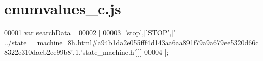 \hypertarget{enumvalues__c_8js_source}{}\section{enumvalues\+\_\+c.\+js}
\label{enumvalues__c_8js_source}

\begin{DoxyCode}
\hypertarget{enumvalues__c_8js_source.tex_l00001}{}\hyperlink{enumvalues__c_8js_ad01a7523f103d6242ef9b0451861231e}{00001} var \hyperlink{enumvalues__c_8js_ad01a7523f103d6242ef9b0451861231e}{searchData}=
00002 [
00003   [\textcolor{stringliteral}{'stop'},[\textcolor{stringliteral}{'STOP'},[\textcolor{stringliteral}{'
      ../state\_\_machine\_8h.html#a94b1da2e055fff4d143aa6aa891f79a9a679ee5320d66c8322e310daeb2ee99b8'},1,\textcolor{stringliteral}{'state\_machine.h'}]]]
00004 ];
\end{DoxyCode}
